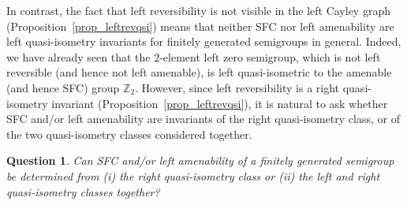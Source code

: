 \documentclass[11pt,a4paper,reqno]{amsart}
\newtheorem{question}[theorem]{Question}
\begin{document}
In contrast, the fact that left reversibility is not visible in the left
Cayley graph (Proposition~\ref{prop_leftrevqsi}) means that neither
SFC nor left amenability are left quasi-isometry invariants for
finitely generated semigroups in general. Indeed, we have already seen
that the
$2$-element left zero semigroup, which is not left reversible (and hence
not left amenable), is left quasi-isometric to the amenable (and hence SFC)
group $\mathbb{Z}_2$. However, since left reversibility is a right
quasi-isometry invariant (Proposition~\ref{prop_leftrevqsi}),
it is natural to ask whether SFC and/or left amenability are invariants
of the right quasi-isometry class, or of the two quasi-isometry classes
considered together.

\begin{question}
Can SFC and/or left amenability of a finitely generated semigroup be determined from (i)
the right quasi-isometry class or (ii) the left and right quasi-isometry
classes together?
\end{question}


\end{document}
